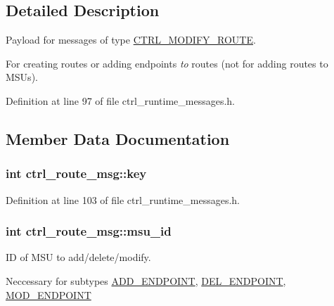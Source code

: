 \subsection{Detailed Description}
Payload for messages of type \hyperlink{ctrl__runtime__messages_8h_aff250b7918a6975b13277c84bc6ec5b9a79d3d73ddfdd3bc9813806c4ca56a6e1}{C\-T\-R\-L\-\_\-\-M\-O\-D\-I\-F\-Y\-\_\-\-R\-O\-U\-T\-E}. 

For creating routes or adding endpoints {\itshape to} routes (not for adding routes to M\-S\-Us). 

Definition at line 97 of file ctrl\-\_\-runtime\-\_\-messages.\-h.



\subsection{Member Data Documentation}
\hypertarget{structctrl__route__msg_a7451a70a3fb1930e1d8746b136d786e2}{
\subsubsection[{key}]{\setlength{\rightskip}{0pt plus 5cm}int ctrl\-\_\-route\-\_\-msg\-::key}}\label{structctrl__route__msg_a7451a70a3fb1930e1d8746b136d786e2}


Definition at line 103 of file ctrl\-\_\-runtime\-\_\-messages.\-h.

\hypertarget{structctrl__route__msg_a4b7d60f38753213c8377e9a04c6c02d4}{
\subsubsection[{msu\-\_\-id}]{\setlength{\rightskip}{0pt plus 5cm}int ctrl\-\_\-route\-\_\-msg\-::msu\-\_\-id}}\label{structctrl__route__msg_a4b7d60f38753213c8377e9a04c6c02d4}


I\-D of M\-S\-U to add/delete/modify. 

Neccessary for subtypes \hyperlink{ctrl__runtime__messages_8h_ad951c7380db78ed80db2c2484eb7daa8af26dd4724e2cbba74770d1a47cf90339}{A\-D\-D\-\_\-\-E\-N\-D\-P\-O\-I\-N\-T}, \hyperlink{ctrl__runtime__messages_8h_ad951c7380db78ed80db2c2484eb7daa8a809144b90957c455b0cd5c6563203731}{D\-E\-L\-\_\-\-E\-N\-D\-P\-O\-I\-N\-T}, \hyperlink{ctrl__runtime__messages_8h_ad951c7380db78ed80db2c2484eb7daa8aeedf1ecfee1e3618cb919b4448498723}{M\-O\-D\-\_\-\-E\-N\-D\-P\-O\-I\-N\-T} 

